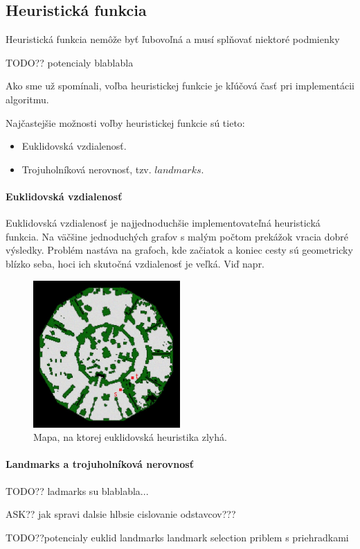 \subsection{Heuristická funkcia}
 Heuristická funkcia nemôže byť ľubovoľná a musí
splňovať niektoré podmienky

TODO?? potencialy blablabla

Ako sme už spomínali, voľba heuristickej funkcie je 
kľúčová časť pri implementácii algoritmu.


Najčastejšie možnosti voľby heuristickej funkcie sú tieto:

\begin{itemize}
\item Euklidovská vzdialenosť.
\item Trojuholníková nerovnosť, tzv. $ landmarks $.
\end{itemize}


\paragraph{Euklidovská vzdialenosť}

Euklidovská vzdialenosť je najjednoduchšie implementovateľná heuristická funkcia. Na väčšine jednoduchých grafov s malým počtom prekážok vracia dobré výsledky. Problém nastáva na grafoch, kde začiatok a koniec cesty sú geometricky blízko seba, hoci ich skutočná vzdialenosť je veľká.
Viď napr. 


\begin{figure}[h]
\centering
\includegraphics[width=0.5\textwidth]{./img/antieuclid505d.jpg}
\caption{Mapa, na ktorej euklidovská heuristika zlyhá.}
\label{fig:antieuclid}
\end{figure}


\paragraph{Landmarks a trojuholníková nerovnosť}
TODO?? ladmarks su blablabla...

ASK?? jak spravi dalsie hlbsie cislovanie odstavcov???







TODO??potencialy euklid landmarks landmark selection priblem s priehradkami
